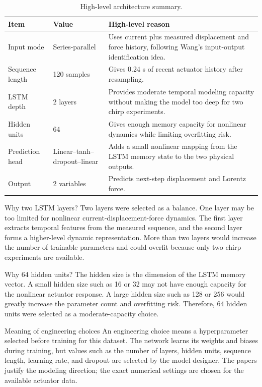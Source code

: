 \documentclass[11pt]{article}
\begin{document}
\begin{table}[H]
\centering
\small
\begin{tabular}{p{4cm}p{3cm}p{7cm}}
\toprule
Item & Value & High-level reason \\
\midrule
Input mode & Series-parallel & Uses current plus measured displacement and force history, following Wang's input-output identification idea. \\
Sequence length & 120 samples & Gives 0.24 s of recent actuator history after resampling. \\
LSTM depth & 2 layers & Provides moderate temporal modeling capacity without making the model too deep for two chirp experiments. \\
Hidden units & 64 & Gives enough memory capacity for nonlinear dynamics while limiting overfitting risk. \\
Prediction head & Linear--tanh--dropout--linear & Adds a small nonlinear mapping from the LSTM memory state to the two physical outputs. \\
Output & 2 variables & Predicts next-step displacement and Lorentz force. \\
\bottomrule
\end{tabular}
\caption{High-level architecture summary.}
\label{tab:arch_summary}
\end{table}

\begin{archbox}{Why two LSTM layers?}
Two layers were selected as a balance. One layer may be too limited for nonlinear current-displacement-force dynamics. The first layer extracts temporal features from the measured sequence, and the second layer forms a higher-level dynamic representation. More than two layers would increase the number of trainable parameters and could overfit because only two chirp experiments are available.
\end{archbox}

\begin{archbox}{Why 64 hidden units?}
The hidden size is the dimension of the LSTM memory vector. A small hidden size such as 16 or 32 may not have enough capacity for the nonlinear actuator response. A large hidden size such as 128 or 256 would greatly increase the parameter count and overfitting risk. Therefore, 64 hidden units were selected as a moderate-capacity choice.
\end{archbox}

\begin{summarybox}{Meaning of engineering choices}
An engineering choice means a hyperparameter selected before training for this dataset. The network learns its weights and biases during training, but values such as the number of layers, hidden units, sequence length, learning rate, and dropout are selected by the model designer. The papers justify the modeling direction; the exact numerical settings are chosen for the available actuator data.
\end{summarybox}
\end{document}
